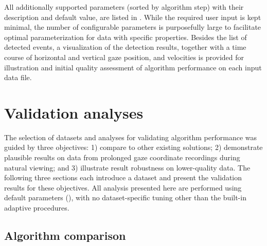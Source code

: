 All additionally supported parameters (sorted by algorithm step) with their
description and default value, are listed in .
While the required user input is kept minimal, the number of configurable
parameters is purposefully large to facilitate optimal parameterization for
data with specific properties. Besides the list of detected events, a
visualization of the detection results, together with a time course of
horizontal and vertical gaze position, and velocities is provided for
illustration and initial quality assessment of algorithm performance on each
input data file.


\section*{Validation analyses}\label{ana}



The selection of datasets and analyses for validating algorithm performance was
guided by three objectives: 1) compare to other existing
solutions; 2) demonstrate plausible results on data from prolonged gaze
coordinate recordings during natural viewing; and 3) illustrate result
robustness on lower-quality data. The following three sections each introduce a
dataset and present the validation results for these objectives.  All analysis
presented here are performed using default parameters (), with
no dataset-specific tuning other than the built-in adaptive procedures.


\subsection*{Algorithm comparison}\label{ana_1}

